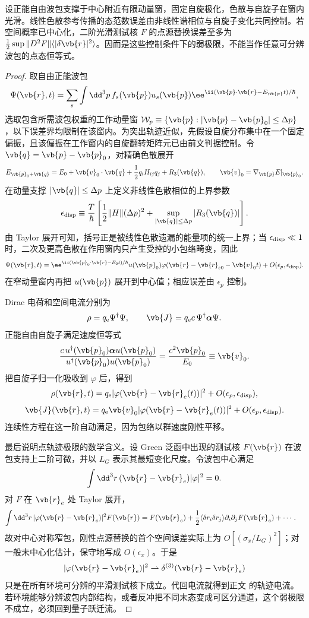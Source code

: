 \begin{proposition}[窄波包的平滑测试核控制]
设正能自由波包支撑于中心附近有限动量窗，固定自旋极化，色散与自旋子在窗内光滑。线性色散参考传播的态范数误差由非线性谱相位与自旋子变化共同控制。若空间概率已中心化，二阶光滑测试核 $F$ 的点源替换误差至多为 $\frac12\sup\|D^2F\|\langle|\delta\vb{r}|^2\rangle$。因而是这些控制条件下的弱极限，不能当作任意可分辨波包的点态恒等式。
\end{proposition}
\begin{proof}
取自由正能波包
\[
\Psi(\vb{r},t)
=
\sum_s\int\dd^3p\,
f_s(\vb{p})u_s(\vb{p})
\ee^{\ii(\vb{p}\cdot\vb{r}-E_{\vb{p}}t)/\hbar},
\]
选取包含所需波包权重的工作动量窗 $\mathcal W_p\equiv\{\vb{p}:|\vb{p}-\vb{p}_0|\le\Delta p\}$，以下误差界均限制在该窗内。为突出轨迹近似，先假设自旋分布集中在一个固定偏振，且该偏振在工作窗内的自旋翻转矩阵元已由前文判据控制。令 $\vb{q}=\vb{p}-\vb{p}_0$，对精确色散展开
\[
E_{\vb{p}_0+\vb{q}}
=E_0+\vb{v}_0\cdot\vb{q}
+\frac12 q_iH_{ij}q_j+R_3(\vb{q}),
\qquad
\vb{v}_0=\nabla_{\vb{p}}E|_{\vb{p}_0}.
\]
在动量支撑 $|\vb{q}|\le\Delta p$ 上定义非线性色散相位的上界参数
\[
\epsilon_{\rm disp}
\equiv
\frac{T}{\hbar}
\left[
\frac12\|H\|(\Delta p)^2
+\sup_{|\vb{q}|\le\Delta p}|R_3(\vb{q})|
\right].
\]
由 Taylor 展开可知，括号正是被线性色散遗漏的能量项的统一上界；当 $\epsilon_{\rm disp}\ll1$ 时，二次及更高色散在作用窗内只产生受控的小包络畸变，因此
\[
\Psi(\vb{r},t)
=
\ee^{\ii(\vb{p}_0\cdot\vb{r}-E_0t)/\hbar}
 u(\vb{p}_0)
\varphi(\vb{r}-\vb{r}_{e0}-\vb{v}_0t)
+O(\epsilon_p,\epsilon_{\rm disp}).
\]
在窄动量窗内再把 $u(\vb{p})$ 展开到中心值；相应误差由 $\epsilon_p$ 控制。

Dirac 电荷和空间电流分别为
\[
\rho=q_{\mathrm e}\Psi^\dagger\Psi,
\qquad
\vb{J}=q_{\mathrm e} c\,\Psi^\dagger\boldsymbol\alpha\Psi.
\]
正能自由自旋子满足速度恒等式
\[
\frac{c\,u^\dagger(\vb{p}_0)\boldsymbol\alpha u(\vb{p}_0)}
{u^\dagger(\vb{p}_0)u(\vb{p}_0)}
=
\frac{c^2\vb{p}_0}{E_0}
\equiv\vb{v}_0.
\]
把自旋子归一化吸收到 $\varphi$ 后，得到
\[
\rho(\vb{r},t)
=q_{\mathrm e}|\varphi(\vb{r}-\vb{r}_e(t))|^2
+O(\epsilon_p,\epsilon_{\rm disp}),
\]
\[
\vb{J}(\vb{r},t)
=q_{\mathrm e}\vb{v}_0|\varphi(\vb{r}-\vb{r}_e(t))|^2
+O(\epsilon_p,\epsilon_{\rm disp}).
\]
连续性方程在这一阶自动满足，因为包络以群速度刚性平移。

最后说明点轨迹极限的数学含义。设 Green 泛函中出现的测试核 $F(\vb{r})$ 在波包支持上二阶可微，并以 $L_G$ 表示其最短变化尺度。令波包中心满足
\[
\int\dd^3r\,(\vb{r}-\vb{r}_e)|\varphi|^2=0.
\]
对 $F$ 在 $\vb{r}_e$ 处 Taylor 展开，
\begin{align*}
\int\dd^3r\,|\varphi(\vb{r}-\vb{r}_e)|^2F(\vb{r})
&=F(\vb{r}_e)
+\frac12\langle\delta r_i\delta r_j\rangle
\partial_i\partial_jF(\vb{r}_e)+\cdots .
\end{align*}
故对中心对称窄包，刚性点源替换的首个空间误差实际上为 $O[(\sigma_x/L_G)^2]$；对一般未中心化估计，保守地写成 $O(\epsilon_x)$。于是
\[
|\varphi(\vb{r}-\vb{r}_e)|^2
\rightharpoonup
\delta^{(3)}(\vb{r}-\vb{r}_e)
\]
只是在所有环境可分辨的平滑测试核下成立。代回电流就得到正文 的轨迹电流。若环境能够分辨波包内部结构，或者反冲把不同末态变成可区分通道，这个弱极限不成立，必须回到量子跃迁流。
\end{proof}


